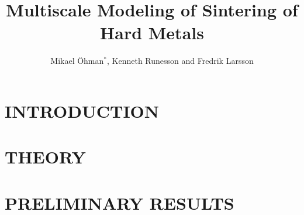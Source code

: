 \documentclass{nordic}
\title{Multiscale Modeling of Sintering of Hard Metals}
\author{Mikael Öhman$^*$, Kenneth Runesson and Fredrik Larsson}
\begin{document}
\maketitle

\section{INTRODUCTION}

\section{THEORY}

\section{PRELIMINARY RESULTS}
\end{document}

